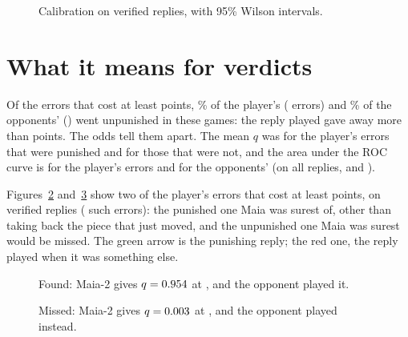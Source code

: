 \documentclass[11pt]{article}
\begin{document}
\begin{figure}[!htbp]
\centering
{}
\caption{Calibration on verified replies, with 95\% Wilson intervals.}
\label{fig:cal}
\end{figure}

\section{What it means for verdicts}

Of the errors that cost at least \StepAt{} points, \PlayerUnpunished\% of the player's
(\PlayerBigErrors{} errors) and \OppUnpunished\% of the opponents' (\OppBigErrors) went
unpunished in these games: the reply played gave away more than \EAt{} points. The odds tell
them apart. The mean $q$ was \PlayerQPunished{} for the player's errors that were punished and
\PlayerQUnpunished{} for those that were not, and the area under the ROC curve is \PlayerAuc{}
\PlayerAucCI{} for the player's errors and \OppAuc{} \OppAucCI{} for the opponents' (on all
replies, \AllPlayerAuc{} and \AllOppAuc).

Figures~\ref{fig:exa} and~\ref{fig:exb} show two of the player's errors that cost at least
\BigLoss{} points, on verified replies (\BigLossEvents{} such errors): the punished one Maia was surest
of, other than taking back the piece that just moved, and the unpunished one Maia was surest
would be missed. The green arrow is the punishing reply; the red one, the reply played when it
was something else.

\begin{figure}[!htbp]\ExampleA\caption{Found: Maia-2 gives \ExampleABest{} $q = 0.954$
at \ExampleABand, and the opponent played it.}\label{fig:exa}\end{figure}
\begin{figure}[!htbp]\ExampleB\caption{Missed: Maia-2 gives \ExampleBBest{} $q = 0.003$
at \ExampleBBand, and the opponent played \ExampleBPlayed{} instead.}\label{fig:exb}\end{figure}
\end{document}

